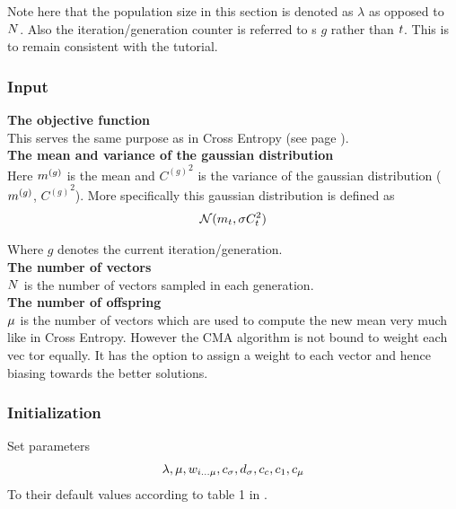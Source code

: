 Note here that the population size in this section is denoted as
$\lambda$ as opposed to $N$. Also the iteration/generation 
counter is referred to s $g$ rather than $t$. 
This is to remain consistent 
with the tutorial.

\subsubsection{Input}

\textbf{The objective function} \\
This serves the same purpose as in Cross Entropy (see page \pageref{CEObjective}).
\\

\textbf{The mean and variance of the gaussian distribution} \\
Here $m^{(g)}$ is the mean and  
${C^{(g)}}^{2}$ is the variance 
of the gaussian distribution ($m^{(g)}$,
${C^{(g)}}^2$). 
More specifically this gaussian distribution is defined as 
\begin{align*}
\mathcal{N}(m_{t},\sigma C^2_{t})
\end{align*}

Where $g$ denotes the current iteration/generation.\\


\textbf{The number of vectors}\\
$N$ is the number of vectors sampled in each generation.
\\

\textbf{The number of offspring}\\
$\mu$ is the number of vectors which are used to compute 
the new mean very much like in Cross Entropy. However the CMA algorithm
is not bound to weight each vec tor equally. It has the option to assign 
a weight to each vector and hence biasing towards the better solutions.
\\


\subsubsection{Initialization}


Set parameters
\begin{align}
\lambda, \mu, w_{i \dots \mu}, c_{\sigma}, d_{\sigma}, c_c, c_1, c_{\mu}
\end{align}
To their default values according to table 1 in \citep{hansen2011}.

